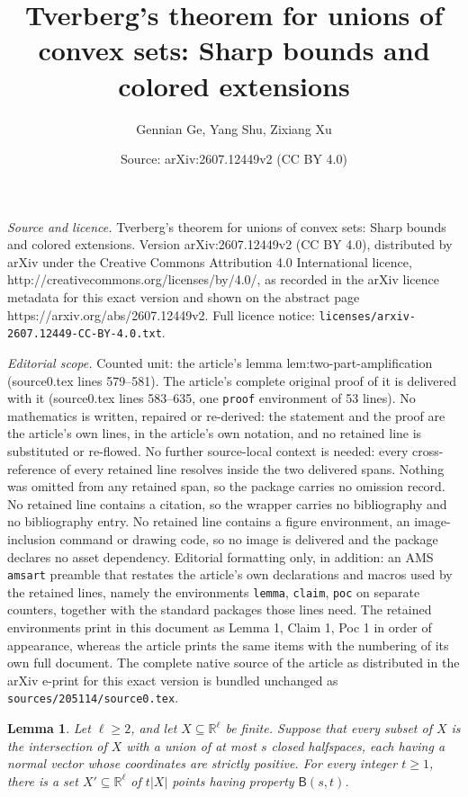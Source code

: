 \documentclass[10pt,a4paper]{amsart}
\title{Tverberg's theorem for unions of convex sets: Sharp bounds and colored extensions}
\author{Gennian Ge, Yang Shu, Zixiang Xu}
\date{Source: arXiv:2607.12449v2 (CC BY 4.0)}
\newtheorem{lemma}{Lemma}
\newcommand{\R}{\mathbb{R}}
\newcommand*{\abs}[1]{\lvert#1\rvert}
\begin{document}
\maketitle

\noindent\emph{Source and licence.} Tverberg's theorem for unions of convex sets: Sharp bounds and colored extensions. Version arXiv:2607.12449v2 (CC BY 4.0), distributed by arXiv under the Creative Commons Attribution 4.0 International licence, http://creativecommons.org/licenses/by/4.0/, as recorded in the arXiv licence metadata for this exact version and shown on the abstract page https://arxiv.org/abs/2607.12449v2. Full licence notice: \texttt{licenses/arxiv-2607.12449-CC-BY-4.0.txt}.\par\smallskip

\noindent\textit{Editorial scope.} Counted unit: the article's lemma lem:two-part-amplification (source0.tex lines 579--581). The article's complete original proof of it is delivered with it (source0.tex lines 583--635, one \texttt{proof} environment of 53 lines). No mathematics is written, repaired or re-derived: the statement and the proof are the article's own lines, in the article's own notation, and no retained line is substituted or re-flowed.  No further source-local context is needed: every cross-reference of every retained line resolves inside the two delivered spans.  Nothing was omitted from any retained span, so the package carries no omission record.  No retained line contains a citation, so the wrapper carries no bibliography and no bibliography entry.  No retained line contains a figure environment, an image-inclusion command or drawing code, so no image is delivered and the package declares no asset dependency.  Editorial formatting only, in addition: an AMS \texttt{amsart} preamble that restates the article's own declarations and macros used by the retained lines, namely the environments \texttt{lemma}, \texttt{claim}, \texttt{poc} on separate counters, together with the standard packages those lines need.  The retained environments print in this document as Lemma 1, Claim 1, Poc 1 in order of appearance, whereas the article prints the same items with the numbering of its own full document.  The complete native source of the article as distributed in the arXiv e-print for this exact version is bundled unchanged as \texttt{sources/205114/source0.tex}.
\begin{lemma}\label{lem:two-part-amplification}
Let \(\ell\ge2\), and let \(X\subseteq\R^{\ell}\) be finite. Suppose that every subset of \(X\) is the intersection of \(X\) with a union of at most \(s\) closed halfspaces, each having a normal vector whose coordinates are strictly positive. For every integer \(t\ge1\), there is a set \(X'\subseteq\R^{\ell}\) of \(t\abs{X}\) points having property \(\mathsf{B}(s,t)\).
\end{lemma}
\end{document}
